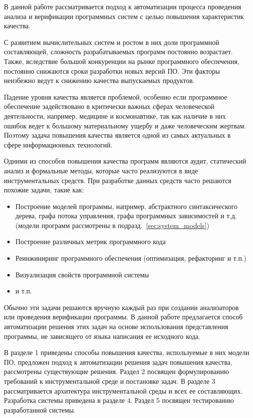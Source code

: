 \intro


В данной работе рассматривается подход к автоматизации процесса проведения
анализа и верификации программных систем с целью повышения характеристик
качества.

С развитием вычислительных систем и ростом в них доли программной составляющей,
сложность разрабатываемых программ постоянно возрастает. Также, вследствие
большой конкуренции на рынке программного обеспечения, постоянно снижаются сроки
разработки новых версий ПО. Эти факторы неизбежно ведут к снижению качества
выпускаемых продуктов.

Падение уровня качества является проблемой, особенно если программное
обеспечение задействовано в критически важных сферах человеческой деятельности,
например, медицине и космонавтике, так как наличие в них ошибок ведет к большому
материальному ущербу и даже человеческим жертвам. Поэтому задача повышения
качества является одной из самых актуальных в сфере информационных технологий.

Одними из способов повышения качества программ являются аудит, статический
анализ и формальные методы, которые часто реализуются в виде инструментальных
средств. При разработке данных средств часто решаются похожие задачи, такие
как:

\begin{itemize}
    \item Построение моделей программы, например, абстрактного синтаксического
    дерева, графа потока управления, графа программных зависимостей и т.д.
    (модели программ рассмотрены в подразд.~\ref{sec:system_models})
    \item Построение различных метрик программного кода
    \item Реинжиниринг программного обеспечения (оптимизация, рефакторинг и т.п.)
    \item Визуализация свойств программной системы
    \item и т.п.
\end{itemize}

Обычно эти задачи решаются вручную каждый раз при создании анализаторов или
проведения верификации программы. В данной работе предлагается способ
автоматизации решения этих задач на основе использования представления
программы, не зависящего от языка написания ее исходного кода.

В разделе 1 приведены способы повышения качества, используемые в них модели ПО,
предложен подход к автоматизации решения задач повышения качества, рассмотрены
существующие решения. Раздел 2 посвящен формулированию требований к
инструментальной среде и постановке задач. В разделе 3 рассматривается
архитектура инструментальной среды и всех ее составляющих. Разработка системы
приведена в разделе 4. Раздел 5 посвящен тестированию разработанной системы.
